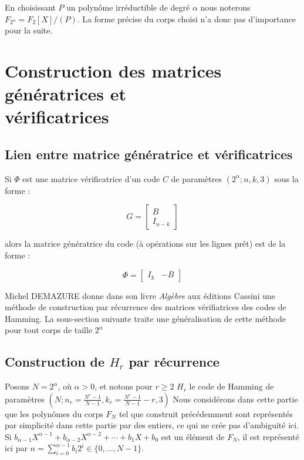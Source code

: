 \documentclass[10pt]{article}
\begin{document}
En choisissant $P$ un polynôme irréductible de degré $\alpha$ nous noterons $F_{2^{\alpha}}=F_2[X]/(P)$. La forme précise du corps choisi n'a donc pas d'importance pour la suite.

\section{Construction des matrices génératrices et\\ vérificatrices}
\subsection{Lien entre matrice génératrice et vérificatrices}
Si $\Phi$ est une matrice vérificatrice d'un code $C$ de paramètres $(2^{\alpha};n,k,3)$ sous la forme : 



$$ G=
\begin{bmatrix}
B \\ I_{n-k}
\end{bmatrix}$$

alors la matrice génératrice du code (à opérations sur les lignes prêt) est de la forme :

$$ \Phi = \begin{bmatrix}
I_k & -B
\end{bmatrix}$$

Michel DEMAZURE donne dans son livre \textit{Algèbre} aux éditions Cassini une méthode de construction par récurrence des matrices vérifiatrices des codes de Hamming. La sous-section suivante traite une généralisation de cette méthode pour tout corps de taille $2^{\alpha}$

\subsection{Construction de $H_r$ par récurrence}


Posons $N=2^{\alpha}$, où ${\alpha}>0$, et notons pour $r \geq 2 $ $H_r$ le code de Hamming de paramètres $(N; n_r= \frac{N^r - 1}{N-1}, k_r = \frac{N^r - 1}{N-1} - r, 3)$
Nous considérons dans cette partie que les polynômes du corps $F_N$ tel que construit précédemment sont représentés par simplicité dans cette partie par des entiers, ce qui ne crée pas d'ambiguité ici. Si $b_{\alpha-1} X^{\alpha-1} + b_{\alpha-2} X^{\alpha -2} + \cdots + b_1 X + b_0$ est un élément de $F_N$, il est représenté ici par $n=\sum_{i=0}^{\alpha - 1} b_i 2^i \in \lbrace 0,...,N-1 \rbrace$.
\end{document}

